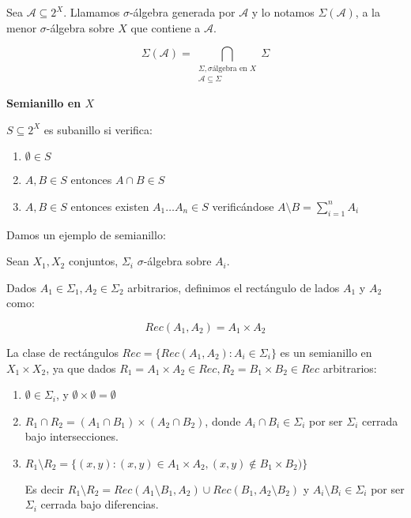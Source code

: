 \begin{definition}
 Sea $\mathcal{A} \subseteq 2^X$. Llamamos $\sigma$-álgebra generada por $\mathcal{A}$ y lo notamos 
 $\Sigma(\mathcal{A})$, a la menor $\sigma$-álgebra sobre $X$ que contiene a $\mathcal{A}$.
 
 \[\Sigma(\mathcal{A}) = 
   \bigcap_{\begin{array}{c}\Sigma, \sigma\textrm{álgebra en } X\\ \mathcal{A}\subseteq \Sigma \end{array}} \Sigma\]
\end{definition}

\begin{definition} \textbf{Semianillo en $X$}

 $S\subseteq 2^X$ es subanillo si verifica:
 
 \begin{enumerate}[i]
  \item $\emptyset \in S$
  \item $A,B \in S$ entonces $A\cap B \in S$
  \item $A,B \in S$ entonces existen $A_1 \ldots A_n \in S$ verificándose $A\setminus B = \sum_{i=1}^n A_i$
 \end{enumerate}
\end{definition}

Damos un ejemplo de semianillo:

\begin{example}
 \begin{definition}
  Sean $X_1, X_2$ conjuntos, $\Sigma_i$ $\sigma$-álgebra sobre $A_i$. 
  
  Dados $A_1 \in \Sigma_1, A_2 \in \Sigma_2$ arbitrarios, definimos el rectángulo de lados $A_1$ y $A_2$ como:
  
  \[Rec(A_1, A_2) = A_1 \times A_2\]
 \end{definition}
 
 
 La clase de rectángulos $Rec = \{Rec(A_1, A_2): A_i \in \Sigma_i\}$ es un semianillo en $X_1 \times X_2$,
 ya que dados $R_1 = A_1 \times A_2 \in Rec, R_2 = B_1 \times B_2 \in Rec$ arbitrarios:
 
 \begin{enumerate}
  \item $\emptyset \in \Sigma_i$, y $\emptyset \times \emptyset = \emptyset$
  \item $R_1 \cap R_2 = (A_1 \cap B_1) \times (A_2 \cap B_2)$, donde $A_i \cap B_i \in \Sigma_i$ por ser 
  $\Sigma_i$ cerrada bajo intersecciones.
  \item $R_1 \setminus R_2 = \{(x,y): (x,y) \in A_1 \times A_2, (x,y) \notin B_1 \times B_2)\}$
  
  Es decir $R_1 \setminus R_2 = Rec(A_1\setminus B_1, A_2) \cup Rec(B_1, A_2\setminus B_2)$ y 
  $A_i \setminus B_i \in \Sigma_i$ por ser $\Sigma_i$ cerrada bajo diferencias.
 \end{enumerate}

\end{example}


